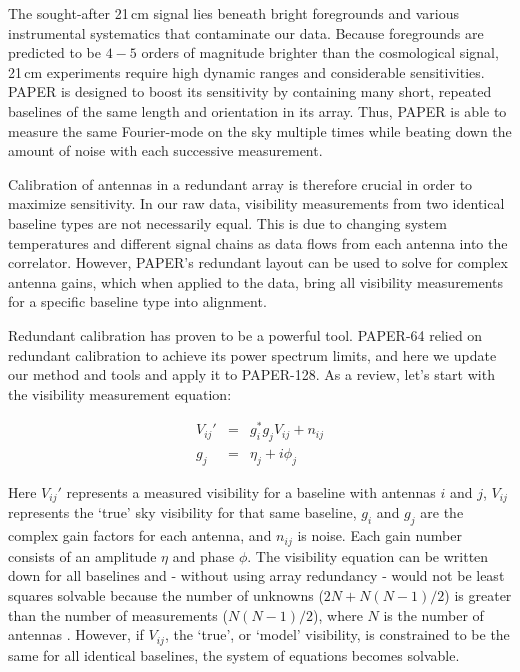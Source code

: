 \documentclass[preprint2,numberedappendix,tighten,twocolappendix]{aastex6}  %
\begin{document}
The sought-after 21\,cm signal lies beneath bright foregrounds and various instrumental systematics that contaminate our data. Because foregrounds are predicted to be $4-5$ orders of magnitude brighter than the cosmological signal, 21\,cm experiments require high dynamic ranges and considerable sensitivities. PAPER is designed to boost its sensitivity by containing many short, repeated baselines of the same length and orientation in its array. Thus, PAPER is able to measure the same Fourier-mode on the sky multiple times while beating down the amount of noise with each successive measurement.

Calibration of antennas in a redundant array is therefore crucial in order to maximize sensitivity. In our raw data, visibility measurements from two identical baseline types are not necessarily equal. This is due to changing system temperatures and different signal chains as data flows from each antenna into the correlator. However, PAPER's redundant layout can be used to solve for complex antenna gains, which when applied to the data, bring all visibility measurements for a specific baseline type into alignment. 

Redundant calibration has proven to be a powerful tool. PAPER-64 relied on redundant calibration to achieve its power spectrum limits, and here we update our method and tools and apply it to PAPER-128. As a review, let's start with the visibility measurement equation:

\begin{eqnarray}
\label{eq:viseq}
V_{ij}' &=& g_{i}^{*}g_{j}V_{ij} + n_{ij} \\
g_{j} &=&\eta_{j} + i\phi_{j}
\end{eqnarray}

Here $V_{ij}'$ represents a measured visibility for a baseline with antennas $i$ and $j$, $V_{ij}$ represents the `true' sky visibility for that same baseline, $g_{i}$ and $g_{j}$ are the complex gain factors for each antenna, and $n_{ij}$ is noise. Each gain number consists of an amplitude $\eta$ and phase $\phi$. The visibility equation can be written down for all baselines and - without using array redundancy - would not be least squares solvable because the number of unknowns ($2N+N(N-1)/2$) is greater than the number of measurements ($N(N-1)/2$), where $N$ is the number of antennas . However, if $V_{ij}$, the `true', or `model' visibility, is constrained to be the same for all identical baselines, the system of equations becomes solvable.
\end{document}
